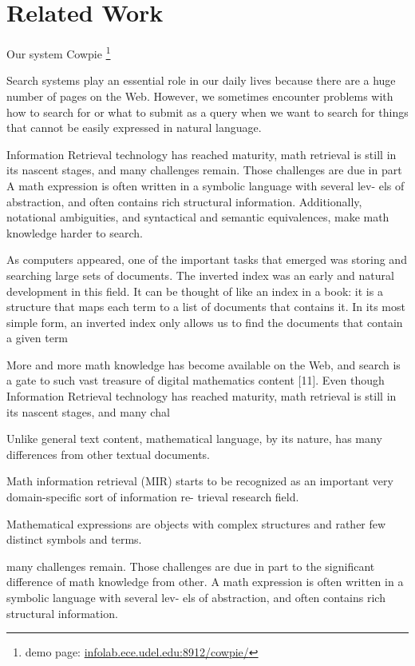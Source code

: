 \section{Related Work}

Our system Cowpie \footnote{demo page: \url{infolab.ece.udel.edu:8912/cowpie/}} \cite{WolframAlpha}

Search systems play an essential role in our daily lives because there are
a huge number of pages on the Web. However, we sometimes encounter
problems with how to search for or what to submit as a query when we
want to search for things that cannot be easily expressed in natural language.

Information Retrieval technology has reached maturity, math retrieval is still in
its nascent stages, and many challenges remain. Those challenges are due in part
A math expression is often written in a symbolic language with several lev-
els of abstraction, and often contains rich structural information. Additionally,
notational ambiguities, and syntactical and semantic equivalences, make math
knowledge harder to search.


As computers appeared, one of the important tasks that emerged was
storing and searching large sets of documents. The inverted index was an
early and natural development in this field. It can be thought of like an index
in a book: it is a structure that maps each term to a list of documents that
contains it. In its most simple form, an inverted index only allows us to find
the documents that contain a given term

More and more math knowledge has become available on the Web, and search
is a gate to such vast treasure of digital mathematics content [11]. Even though
Information Retrieval technology has reached maturity, math retrieval is still in
its nascent stages, and many chal

Unlike general text content, mathematical language, by its nature, has many differences from other textual documents. 

Math information retrieval (MIR) starts to be recognized
as an important very domain-specific sort of information re-
trieval research field.

Mathematical expressions are objects with complex
structures and rather few distinct symbols and terms.

many challenges remain. Those challenges are due in part
to the significant difference of math knowledge from other.
A math expression is often written in a symbolic language with several lev-
els of abstraction, and often contains rich structural information.

